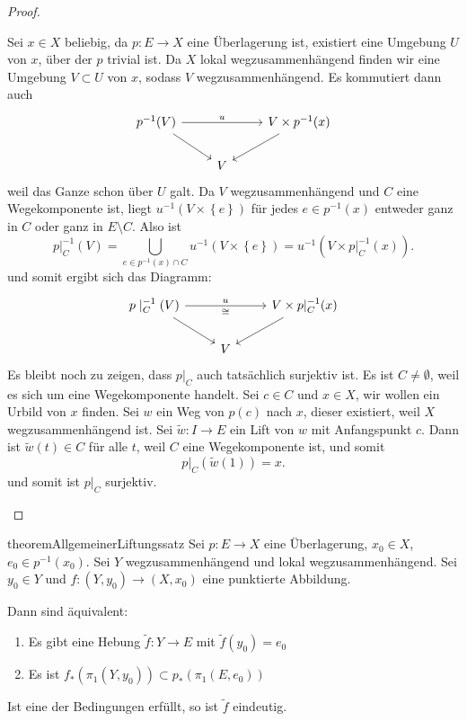 \begin{proof}
\begin{enumerate}[1)]
            Sei $x\in X$ beliebig, da $p\colon  E \to  X$ eine Überlagerung ist, existiert eine Umgebung $U$ von  $x$, über der  $p$ trivial ist. Da $X$ lokal wegzusammenhängend finden wir  eine Umgebung $V\subset U$ von $x$, sodass  $V$ wegzusammenhängend. Es kommutiert dann auch
            \[
            \begin{tikzcd}
                p^{-1} (V) \ar{rr}{u} \ar[swap]{dr}{} & & V\times p^{-1} (x) \ar{dl}{} \\
            & V
            \end{tikzcd}
            \]
            weil das Ganze schon über $U$ galt. Da  $V$ wegzusammenhängend und  $C$ eine Wegekomponente ist, liegt  $u^{-1}(V\times \left \{e\right\} )$ für jedes $e\in p^{-1} (x)$ entweder ganz in $C$ oder ganz in  $E\setminus C$. Also ist
            \[
                p|_{C}^{-1}(V) = \bigcup_{e\in p^{-1} (x)\cap C} u^{-1}(V\times \left \{e\right\} ) = u^{-1}(V\times p|_{C}^{-1}(x)) 
            .\] 
            und somit ergibt sich das Diagramm:
            \[
            \begin{tikzcd}
                p\mid _C^{-1}(V) \ar{rr}{u}[swap]{\cong} \ar[swap]{dr}{} & & V\times p|_{C}^{-1}(x) \ar{dl}{} \\
            & V
            \end{tikzcd}
            \]
            Es bleibt noch zu zeigen, dass $p|_C$ auch tatsächlich surjektiv ist. Es ist  $C\neq \emptyset$, weil es sich um eine Wegekomponente handelt. Sei $c\in C$ und $x\in X$, wir wollen ein Urbild von $x$ finden. Sei  $w$ ein Weg von $p(c)$ nach  $x$, dieser existiert, weil  $X$ wegzusammenhängend ist. Sei  $\tilde{w}\colon  I \to E$ ein Lift von $w$ mit Anfangspunkt $c$. Dann ist  $\tilde{w}(t) \in C$ für alle $t$, weil  $C$ eine Wegekomponente ist, und somit
             \[
                 p|_C(\tilde{w}(1)) = x
            .\] 
            und somit ist $p|_C$ surjektiv.
    \end{enumerate}
\end{proof}

\begin{restatable}{theorem}{AllgemeinerLiftungssatz}\label{thm:allgemeiner-liftungssatz}
    Sei $p\colon  E \to X$ eine Überlagerung, $x_0\in X$, $e_0\in p^{-1} (x_0)$. Sei $Y$ wegzusammenhängend und lokal wegzusammenhängend. Sei  $y_0\in Y$ und $f\colon  (Y,y_0) \to  (X,x_0)$ eine punktierte Abbildung.

    Dann sind äquivalent:
    \begin{enumerate}[1)]
        \item Es gibt eine Hebung $\tilde{f}\colon  Y \to  E$ mit $\tilde{f}(y_0) = e_0$
        \item Es ist $f_*(\pi_1(Y,y_0)) \subset p_*(\pi_1(E,e_0))$
    \end{enumerate}
    Ist eine der Bedingungen erfüllt, so ist $\tilde{f}$ eindeutig.
\end{restatable}

